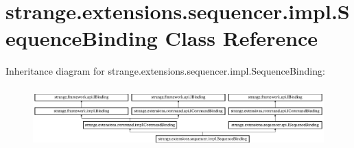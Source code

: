 \hypertarget{classstrange_1_1extensions_1_1sequencer_1_1impl_1_1_sequence_binding}{\section{strange.\-extensions.\-sequencer.\-impl.\-Sequence\-Binding Class Reference}
\label{classstrange_1_1extensions_1_1sequencer_1_1impl_1_1_sequence_binding}
}
Inheritance diagram for strange.\-extensions.\-sequencer.\-impl.\-Sequence\-Binding\-:\begin{figure}[H]
\begin{center}
\leavevmode
\includegraphics[height=2.362869cm]{classstrange_1_1extensions_1_1sequencer_1_1impl_1_1_sequence_binding}
\end{center}
\end{figure}
